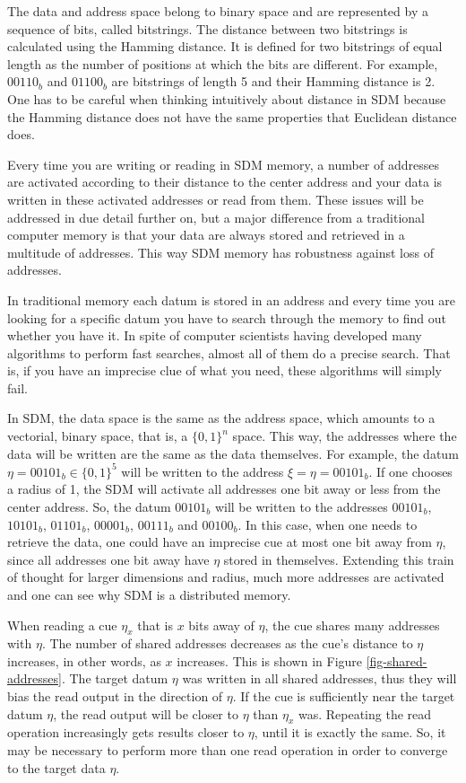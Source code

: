The data and address space belong to binary space and are represented by a sequence of bits, called bitstrings. The distance between two bitstrings is calculated using the Hamming distance. It is defined for two bitstrings of equal length as the number of positions at which the bits are different. For example, $00110_{b}$ and $01100_{b}$ are bitstrings of length 5 and their Hamming distance is 2. One has to be careful when thinking intuitively about distance in SDM because the Hamming distance does not have the same properties that Euclidean distance does.

Every time you are writing or reading in SDM memory, a number of addresses are activated according to their distance to the center address and your data is written in these activated addresses or read from them.  These issues will be addressed in due detail further on, but a major difference from a traditional computer memory is that your data are always stored and retrieved in a multitude of addresses. This way SDM memory has robustness against loss of addresses.

In traditional memory each datum is stored in an address and every time you are looking for a specific datum you have to search through the memory to find out whether you have it. In spite of computer scientists having developed many algorithms to perform fast searches, almost all of them do a precise search. That is, if you have an imprecise clue of what you need, these algorithms will simply fail.

In SDM, the data space is the same as the address space, which amounts to a vectorial, binary space, that is, a $\{0,1\}^{n}$ space. This way, the addresses where the data will be written are the same as the data themselves. For example, the datum $\eta=00101_{b}\in\{0,1\}^{5}$ will be written to the address $\xi=\eta=00101_{b}$. If one chooses a radius of 1, the SDM will activate all addresses one bit away or less from the center address. So, the datum $00101_{b}$ will be written to the addresses $00101_{b}$, $10101_{b}$, $01101_{b}$, $00001_{b}$, $00111_{b}$ and $00100_{b}$. In this case, when one needs to retrieve the data, one could have an imprecise cue at most one bit away from $\eta$, since all addresses one bit away have $\eta$ stored in themselves.  Extending this train of thought for larger dimensions and radius, much more addresses are activated and one can see why SDM is a distributed memory.

When reading a cue $\eta_{x}$ that is $x$ bits away of $\eta$, the cue shares many addresses with $\eta$. The number of shared addresses decreases as the cue's distance to $\eta$ increases, in other words, as $x$ increases. This is shown in Figure \ref{fig-shared-addresses}.  The target datum $\eta$ was written in all shared addresses, thus they will bias the read output in the direction of $\eta$. If the cue is sufficiently near the target datum $\eta$, the read output will be closer to $\eta$ than $\eta_{x}$ was. Repeating the read operation increasingly gets results closer to $\eta$, until it is exactly the same. So, it may be necessary to perform more than one read operation in order to converge to the target data $\eta$.

